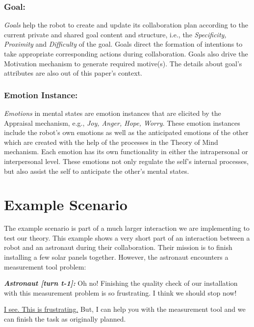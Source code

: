 \documentclass{aamas2016}
\begin{document}
\subsubsection{Goal:}

\textit{Goals} help the robot to create and update its collaboration plan
according to the current private and shared goal content and structure, i.e.,
the \textit{Specificity, Proximity} and \textit{Difficulty} of the goal. Goals
direct the formation of intentions to take appropriate corresponding actions
during collaboration. Goals also drive the Motivation mechanism to generate
required motive(s). The details about goal's attributes are also out of this
paper's context.

\subsubsection{Emotion Instance:}

\textit{Emotions} in mental states are emotion instances that are elicited by
the Appraisal mechanism, e.g., \textit{Joy, Anger, Hope, Worry}. These emotion
instances include the robot's own emotions as well as the anticipated emotions
of the other which are created with the help of the processes in the Theory of
Mind mechanism. Each emotion has its own functionality in either the
intrapersonal or interpersonal level. These emotions not only regulate the
self's internal processes, but also assist the self to anticipate the other's
mental states.

\section{Example Scenario}

The example scenario is part of a much larger interaction we are implementing to
test our theory. This example shows a very short part of an interaction between
a robot and an astronaut during their collaboration. Their mission is to finish
installing a few solar panels together. However, the astronaut encounters a
measurement tool problem:

\begin{description}
  \item \textit{\textbf{\fontsize{9pt}{12pt}\selectfont Astronaut [turn t-1]:}}
  Oh no! Finishing the quality check of our installation with this measurement
  problem is so frustrating. I think we should stop now!

  \item \textit{\textbf{\fontsize{9pt}{12pt}\selectfont{Robot [turn t]:}}}
  \underline{I see. This is frustrating.} But, I can help you with the
  measurement tool and we can finish the task as originally planned.
\end{description}
\end{document}
